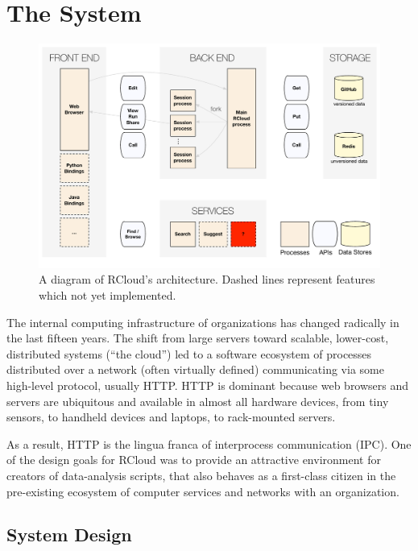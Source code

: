\section{The System\label{sec:system}}


\begin{figure}
\includegraphics[width=\linewidth]{fig/system/system.pdf}
\caption{\label{fig:system}A diagram of RCloud's architecture. Dashed
  lines represent features which not yet implemented.}
\end{figure}

The internal computing infrastructure of organizations has changed
radically in the last fifteen years. The shift from large
servers toward scalable, lower-cost, distributed systems (``the cloud'')
led to a software ecosystem of processes distributed over a
network (often virtually defined) communicating via some
high-level protocol, usually HTTP.  HTTP is dominant because web
browsers and servers are ubiquitous and available in almost
all hardware devices, from tiny sensors, to handheld devices and
laptops, to rack-mounted servers.

As a result, HTTP is the lingua franca of interprocess communication
(IPC). One of the design goals for RCloud was to provide an attractive
environment for creators of data-analysis scripts, that also behaves
as a first-class citizen in the pre-existing ecosystem of computer
services and networks with an organization.


\subsection{System Design}

